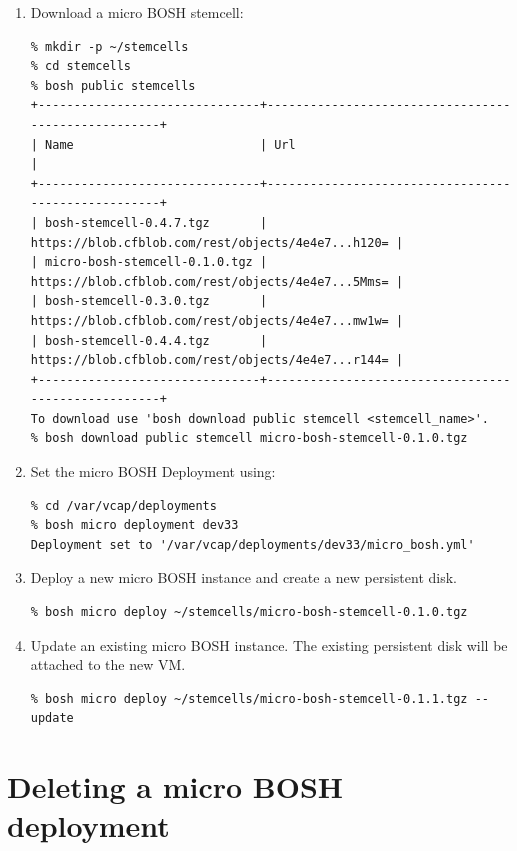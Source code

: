 \begin{enumerate}
\item Download a micro BOSH stemcell:

\begin{verbatim}
% mkdir -p ~/stemcells
% cd stemcells
% bosh public stemcells
+-------------------------------+----------------------------------------------------+
| Name                          | Url                                                |
+-------------------------------+----------------------------------------------------+
| bosh-stemcell-0.4.7.tgz       | https://blob.cfblob.com/rest/objects/4e4e7...h120= |
| micro-bosh-stemcell-0.1.0.tgz | https://blob.cfblob.com/rest/objects/4e4e7...5Mms= |
| bosh-stemcell-0.3.0.tgz       | https://blob.cfblob.com/rest/objects/4e4e7...mw1w= |
| bosh-stemcell-0.4.4.tgz       | https://blob.cfblob.com/rest/objects/4e4e7...r144= |
+-------------------------------+----------------------------------------------------+
To download use 'bosh download public stemcell <stemcell_name>'.
% bosh download public stemcell micro-bosh-stemcell-0.1.0.tgz
\end{verbatim}


\item Set the micro BOSH Deployment using:

\begin{verbatim}
% cd /var/vcap/deployments
% bosh micro deployment dev33
Deployment set to '/var/vcap/deployments/dev33/micro_bosh.yml'
\end{verbatim}


\item Deploy a new micro BOSH instance and create a new persistent disk.

\begin{verbatim}
% bosh micro deploy ~/stemcells/micro-bosh-stemcell-0.1.0.tgz
\end{verbatim}


\item Update an existing micro BOSH instance. The existing persistent disk will be attached to the new VM.

\begin{verbatim}
% bosh micro deploy ~/stemcells/micro-bosh-stemcell-0.1.1.tgz --update
\end{verbatim}


\end{enumerate}

\section{Deleting a micro BOSH deployment}
\label{deletingamicroboshdeployment}

